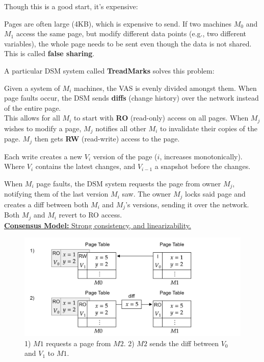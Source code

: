 \newpage 

\noindent
Though this is a good start, it's expensive:

\begin{theo}

    Pages are often large (4KB), which is expensive to send.
    If two machines $M_0$ and $M_1$ access the same page, but modify different data points (e.g., two different variables),
    the whole page needs to be sent even though the data is not shared. This is called \textbf{false sharing}.
\end{theo}

\noindent
A particular DSM system called \textbf{TreadMarks} solves this problem:
\begin{Def}

    Given a system of $M_i$ machines, the VAS is evenly divided amongst them.
    When page faults occur, the DSM sends \textbf{diffs} (change history) over the network instead of the entire page.\\

    \noindent
    This allows for all $M_i$ to start with \textbf{RO} (read-only) access on all pages. When $M_j$ wishes to 
    modify a page, $M_j$ notifies all other $M_i$ to invalidate their copies of the page. $M_j$ then gets \textbf{RW} (read-write) access to the page.


    Each write creates a new $V_i$ version of the page ($i$, increases monotonically). Where $V_i$ contains the latest changes, and $V_{i-1}$ a snapshot before the changes.
    
    When $M_i$ page faults, the DSM system requests the page from owner $M_j$, notifying them of the last version $M_i$ saw. The owner $M_j$ locks said page and creates a diff between both $M_i$ and $M_j$'s versions, sending it over the network.
    Both $M_j$ and $M_i$ revert to RO access.\\

    \noindent
    \underline{\textbf{Consensus Model:} Strong consistency, and linearizability.}
\end{Def}

\vspace{-1em}
\begin{figure}[h]
    \centering
    \includegraphics[width=\textwidth]{Sections/shared/tread.png}
    \caption{1) $M1$ requests a page from $M2$. 2) $M2$ sends the diff between $V_0$ and $V_1$ to $M1$.}
    \label{fig:dsm}
\end{figure}

    